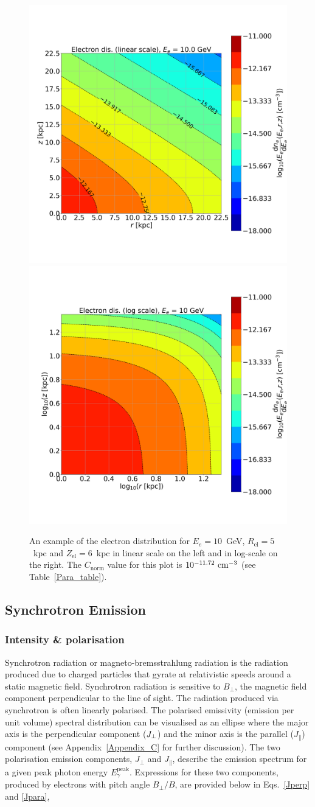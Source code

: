 \documentclass[usenatbib]{mnras}
\begin{document}
\begin{figure}
\centering
\includegraphics[width=0.49\linewidth]{Images/Linear_EdNdE.png}%
\includegraphics[width = 0.49\linewidth]{Images/Log_EdNdE.png}
\caption{An example of the electron distribution for $E_e = 10$~GeV, $R_{\mathrm{el}} = 5$~kpc and $Z_{\mathrm{el}} = 6$~kpc in linear scale on the left and in log-scale on the right. The $C_\mathrm{norm}$ value for this plot is $10^{-11.72}~{\rm cm}^{-3}$ (see Table~\ref{Para_table}).}  
\label{fig:electron_density}
\end{figure}
\subsection{Synchrotron Emission}\label{Synchrotron_theory}

\subsubsection{Intensity \& polarisation}
Synchrotron radiation or magneto-bremsstrahlung radiation is the radiation produced due to charged particles that gyrate at relativistic speeds around a static magnetic field. Synchrotron radiation is sensitive to $B_{\perp}$, the magnetic field component perpendicular to the line of sight. The radiation produced via synchrotron is often linearly polarised.
The polarised emissivity (emission per unit volume) spectral distribution can be visualised as an ellipse where the major axis is the perpendicular component ($J_{\rm \perp}$) and the minor axis is the parallel ($J_{\parallel}$) component (see Appendix~\ref{Appendix_C} for further discussion). 
The two polarisation emission components, $J_{\perp}$ and $J_{\parallel}$, describe the emission spectrum for a given peak photon energy $E_{\gamma}^{\mathrm{peak}}$.
Expressions for these two components, produced by electrons with pitch angle $B_{\perp}/B$, are provided below in Eqs.~\ref{Jperp} and \ref{Jpara},
\end{document}
